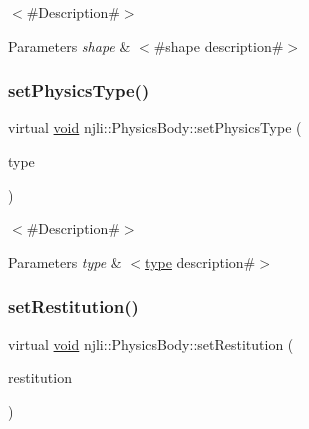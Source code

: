 $<$\#\+Description\#$>$


\begin{DoxyParams}{Parameters}
{\em shape} & $<$\#shape description\#$>$ \\
\hline
\end{DoxyParams}
\mbox{\label{classnjli_1_1_physics_body_ae9b3b3115dbc70f21b5f5fb8c66aa18c}} 
\subsubsection{\texorpdfstring{set\+Physics\+Type()}{setPhysicsType()}}
{\footnotesize\ttfamily virtual \mbox{\hyperlink{_thread_8h_af1e856da2e658414cb2456cb6f7ebc66}{void}} njli\+::\+Physics\+Body\+::set\+Physics\+Type (\begin{DoxyParamCaption}\item[{\mbox{\hyperlink{namespacenjli_a60ba626f4609f81870c92d042c6bc83d}{njli\+Physics\+Type}}}]{type }\end{DoxyParamCaption})\hspace{0.3cm}{\ttfamily [virtual]}}

$<$\#\+Description\#$>$


\begin{DoxyParams}{Parameters}
{\em type} & $<$\mbox{\hyperlink{classnjli_1_1_physics_body_a98036bcbea6e3269603a83e532d2e5ab}{type}} description\#$>$ \\
\hline
\end{DoxyParams}
\mbox{\label{classnjli_1_1_physics_body_a9741d811656fcd2865d688627ee2ea8b}} 
\subsubsection{\texorpdfstring{set\+Restitution()}{setRestitution()}}
{\footnotesize\ttfamily virtual \mbox{\hyperlink{_thread_8h_af1e856da2e658414cb2456cb6f7ebc66}{void}} njli\+::\+Physics\+Body\+::set\+Restitution (\begin{DoxyParamCaption}\item[{\mbox{\hyperlink{_util_8h_a5f6906312a689f27d70e9d086649d3fd}{f32}}}]{restitution }\end{DoxyParamCaption})\hspace{0.3cm}{\ttfamily [virtual]}}

